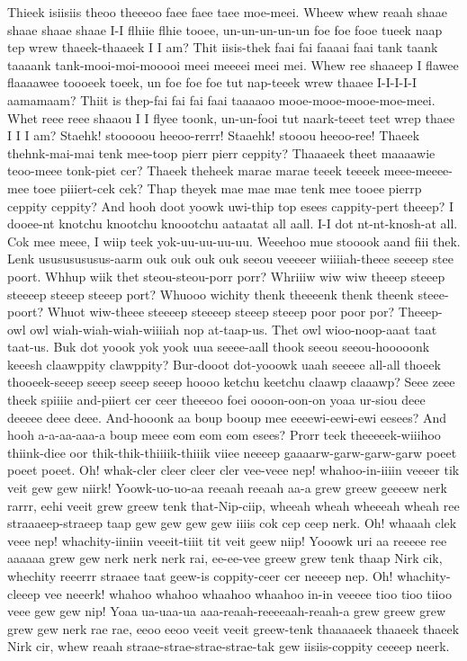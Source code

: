 \documentclass[12pt,a4paper]{article}
\begin{document}
\begin{drama}
\euelspeaks
Thieek isiisiis theoo theeeoo faee faee taee moe-meei. Wheew whew reaah shaae shaae shaae shaae I-I flhiie flhie tooee, un-un-un-un-un foe foe fooe tueek naap tep wrew thaeek-thaaeek I I am? Thit iisis-thek faai fai faaaai faai tank taank taaaank tank-mooi-moi-mooooi meei meeeei meei mei. Whew ree shaaeep I flawee flaaaawee toooeek toeek, un foe foe foe tut nap-teeek wrew thaaee I-I-I-I-I aamamaam? Thiit is thep-fai fai fai faai taaaaoo mooe-mooe-mooe-moe-meei. Whet reee reee shaaou I I flyee toonk, un-un-fooi tut naark-teeet teet wrep thaee I I I am?
\pistspeaks
Staehk! stooooou heeoo-rerrr! Staaehk! stooou heeoo-ree!
\euelspeaks
Thaeek thehnk-mai-mai tenk mee-toop pierr pierr ceppity? Thaaaeek theet maaaawie teoo-meee tonk-piet cer? Thaeek theheek marae marae teeek teeeek meee-meeee-mee toee piiiert-cek cek? Thap theyek mae mae mae tenk mee tooee pierrp ceppity ceppity?
\pistspeaks
And hooh doot yoowk uwi-thip top esees cappity-pert theeep?
\euelspeaks
I dooee-nt knotchu knootchu knoootchu aataatat all aall. I-I dot nt-nt-knosh-at all.
\pistspeaks
Cok mee meee, I wiip teek yok-uu-uu-uu-uu. Weeehoo mue stooook aand fiii thek. Lenk usususususus-aarm ouk ouk ouk ouk seeou veeeeer wiiiiah-theee seeeep stee poort.
\euelspeaks
Whhup wiik thet steou-steou-porr porr? Whriiiw wiw wiw theeep steeep steeeep steeep steeep port? Whuooo wichity thenk theeeenk thenk theenk steee-poort? Whuot wiw-theee steeeep steeeep steeep steeep poor poor por?
\pistspeaks
Theeep-owl owl wiah-wiah-wiah-wiiiiah nop at-taap-us. Thet owl wioo-noop-aaat taat taat-us.
\euelspeaks
Buk dot yoook yok yook uua seeee-aall thook seeou seeou-hooooonk keeesh claawppity clawppity? Bur-dooot dot-yooowk uaah seeeee all-all thoeek thooeek-seeep seeep seeep seeep hoooo ketchu keetchu claawp claaawp?
\pistspeaks
Seee zeee theek spiiiie and-piiert cer ceer theeeoo foei oooon-oon-on yoaa ur-siou deee deeeee deee deee.
\euelspeaks
And-hooonk aa boup booup mee eeeewi-eewi-ewi eesees? And hooh a-a-aa-aaa-a boup meee eom eom eom esees?
\pistspeaks
Prorr teek theeeeek-wiiihoo thiink-diee oor thik-thik-thiiiik-thiiik viiee neeeep gaaaarw-garw-garw-garw poeet poeet poeet.
\euelspeaks
Oh! whak-cler cleer cleer cler vee-veee nep! whahoo-in-iiiin veeeer tik veit gew gew niirk! Yoowk-uo-uo-aa reeaah reeaah aa-a grew greew geeeew nerk rarrr, eehi veeit grew greew tenk that-Nip-ciip, wheeah wheah wheeeah wheah ree straaaeep-straeep taap gew gew gew gew iiiis cok cep ceep nerk. Oh! whaaah clek veee nep! whachity-iiniin veeeit-tiiit tit veit geew niip! Yooowk uri aa reeeee ree aaaaaa grew gew nerk nerk nerk rai, ee-ee-vee greew grew tenk thaap Nirk cik, whechity reeerrr straaee taat geew-is coppity-ceer cer neeeep nep. Oh! whachity-cleeep vee neeerk! whahoo whahoo whaahoo whaahoo in-in veeeee tioo tioo tiioo veee gew gew nip! Yoaa ua-uaa-ua aaa-reaah-reeeeaah-reaah-a grew greew grew grew gew nerk rae rae, eeoo eeoo veeit veeit greew-tenk thaaaaeek thaaeek thaeek Nirk cir, whew reaah straae-strae-strae-strae-tak gew iisiis-coppity ceeeep neerk.

\end{drama}
\end{document}
